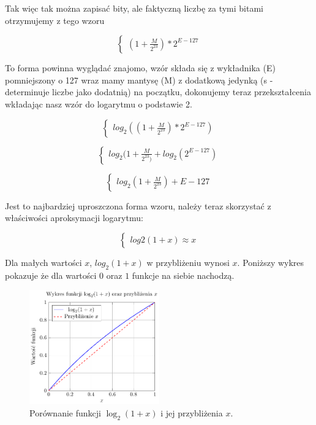 \documentclass[12pt]{article}
\begin{document}
\noindent Tak więc tak można zapisać bity, ale faktyczną liczbę za tymi bitami otrzymujemy z tego wzoru

$$ \begin{cases}
(1 + \frac{M}{2^{23}}) * 2^{E-127}
\end{cases} $$

\noindent To forma powinna wyglądać znajomo, wzór składa się z wykładnika (E) pomniejszony o 127 wraz mamy mantysę (M) z dodatkową jedynką (s - determinuje liczbe jako dodatnią) na początku, dokonujemy teraz przekształcenia wkładając nasz wzór do logarytmu o podstawie 2.

$$ \begin{cases}
log_2((1 + \frac{M}{2^{23}}) * 2^{E-127})
\end{cases} $$

$$ \begin{cases}
log_2(1 + \frac{M}{2^{23})} + log_2(2^{E-127})
\end{cases} $$

$$ \begin{cases}
log_2(1 + \frac{M}{2^{23}}) + E-127
\end{cases} $$

\noindent Jest to najbardziej uproszczona forma wzoru, należy teraz skorzystać z właściwości aproksymacji logarytmu:

$$ \begin{cases}
log2(1 + x) \approx x
\end{cases} $$

\noindent Dla małych wartości $x$, $log_2(1+x)$ w przybliżeniu wynosi $x$. Poniższy wykres pokazuje że dla wartości $0$ oraz $1$ funkcje na siebie nachodzą. 

\begin{figure}[H]  
\centering
\includegraphics[width=0.5\textwidth]{aproksymacja.pdf} 
\caption{Porównanie funkcji $\log_2(1 + x)$ i jej przybliżenia $x$.}
\label{fig:log_approx}
\end{figure}
\end{document}
